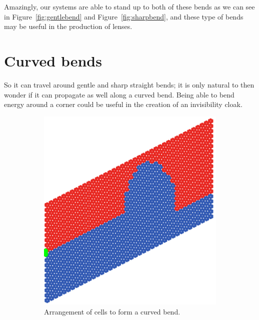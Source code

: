 Amazingly, our systems are able to stand up to both of these bends as we can see
in Figure~\ref{fig:gentlebend} and Figure~\ref{fig:sharpbend}, and these type
of bends may be useful in the production of lenses.\cite{negrefraclens}

\section{Curved bends}
So it can travel around gentle and sharp straight bends; it is only natural to
then wonder if it can propagate as well along a curved bend. Being able to bend
energy around a corner could be useful in the creation of an invisibility
cloak.\cite{emcloak}

\begin{figure}[!h]
\centering
\begin{subfigure}[b]{.5\textwidth}
  \centering
  \includegraphics[width=0.8\linewidth]{imgs/curvedbendarr.png}
  \caption{Arrangement of cells to form a curved bend.}
  \label{fig:sub1}
\end{subfigure}%
\begin{subfigure}[b]{.5\textwidth}
  \centering

\end{subfigure}
\end{figure}
